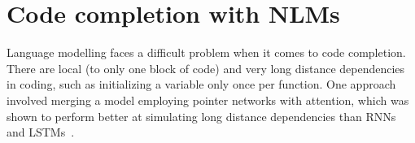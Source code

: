 \section{Code completion with NLMs}
Language modelling faces a difficult problem when it comes to code completion. There are local (to only one block of code) and very long distance dependencies in coding, such as initializing a variable only once per function. One approach involved merging a model employing pointer networks with attention, which was shown to perform better at simulating long distance dependencies than RNNs and LSTMs~\cite{ccnlm}.






